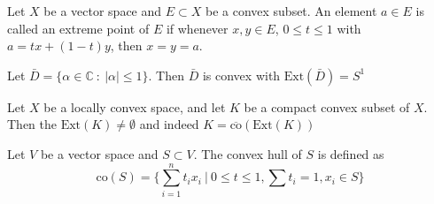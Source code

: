 \begin{definition}
  Let $X$ be a vector space and $E \subset X$ be a convex subset. An element $a \in E$ is called an extreme point of $E$ if whenever $x, y \in E$, $0 \le t \le 1$ with $a  = tx + (1-t) y$, then $x = y = a$.
\end{definition}
\begin{example}
  Let $\bar{D} = \{ \alpha \in \mathbb{C} \ : \ |\alpha| \le 1 \}$. Then $\bar{D}$ is convex with $\textrm{Ext}(\bar{D}) = S^1$
\end{example}

\begin{theorem}
  Let $X$ be a locally convex space, and let $K$ be a compact convex subset of $X$. Then the $ \textrm{Ext}(K) \neq \emptyset$ and indeed $K = \overline{\textrm{co}}(\textrm{Ext}(K))$
\end{theorem}

\begin{definition}
     Let $V$ be a vector space and $S\subset V$. The convex hull of $S$ is defined as \[
       \textrm{co}(S) = \Big \{ \sum_{i = 1}^{n} t_i x_i \ \Big| \ 0 \le t \le 1, \sum t_i = 1, x_i \in S \Big\}
     \]
\end{definition}
